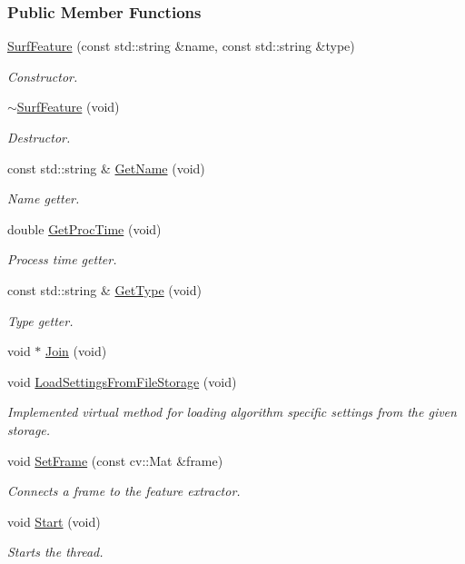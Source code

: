 \subsubsection*{Public Member Functions}
\begin{DoxyCompactItemize}
\item 
\hyperlink{group___feature_extractor_a9a359bdd5b3bbc6ac0d318e150a8feef}{Surf\-Feature} (const std\-::string \&name, const std\-::string \&type)
\begin{DoxyCompactList}\small\item\em Constructor. \end{DoxyCompactList}\item 
\hyperlink{group___feature_extractor_a9dac0fead0f72630852c04aa0af5213f}{$\sim$\-Surf\-Feature} (void)
\begin{DoxyCompactList}\small\item\em Destructor. \end{DoxyCompactList}\item 
const std\-::string \& \hyperlink{group___feature_extractor_a5f69ca2455d5eec4493dbf115d00d5c9}{Get\-Name} (void)
\begin{DoxyCompactList}\small\item\em Name getter. \end{DoxyCompactList}\item 
double \hyperlink{group___feature_extractor_ad07a3104192b50d911eee634a0be009d}{Get\-Proc\-Time} (void)
\begin{DoxyCompactList}\small\item\em Process time getter. \end{DoxyCompactList}\item 
const std\-::string \& \hyperlink{group___feature_extractor_a6724c19006d495bd6a9c8c6029236ebc}{Get\-Type} (void)
\begin{DoxyCompactList}\small\item\em Type getter. \end{DoxyCompactList}\item 
void $\ast$ \hyperlink{group___core_a8f33f7750321d5df9188033e7e3e300d}{Join} (void)
\item 
void \hyperlink{group___feature_extractor_a3717dc5d5cffd77f4f31c5ac81cd391a}{Load\-Settings\-From\-File\-Storage} (void)
\begin{DoxyCompactList}\small\item\em Implemented virtual method for loading algorithm specific settings from the given storage. \end{DoxyCompactList}\item 
void \hyperlink{group___feature_extractor_a3c58d995fb2440b28db3b21b54b94815}{Set\-Frame} (const cv\-::\-Mat \&frame)
\begin{DoxyCompactList}\small\item\em Connects a frame to the feature extractor. \end{DoxyCompactList}\item 
void \hyperlink{group___core_a2b42f82341afd2747ea093b6ac8b91cb}{Start} (void)
\begin{DoxyCompactList}\small\item\em Starts the thread. \end{DoxyCompactList}\end{DoxyCompactItemize}
